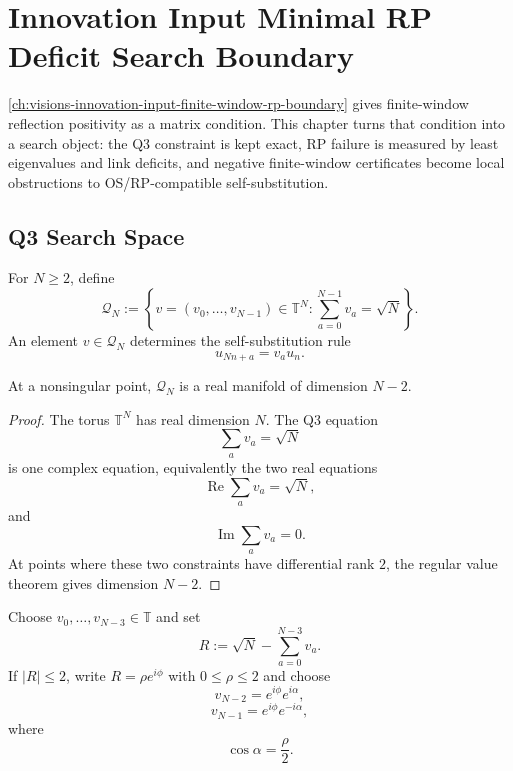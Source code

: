\chapter{Innovation Input Minimal RP Deficit Search Boundary}
\label{ch:visions-innovation-input-minimal-rp-deficit-search-boundary}

\autoref{ch:visions-innovation-input-finite-window-rp-boundary} gives
finite-window reflection positivity as a matrix condition. This chapter
turns that condition into a search object: the Q3 constraint is kept exact,
RP failure is measured by least eigenvalues and link deficits, and negative
finite-window certificates become local obstructions to OS/RP-compatible
self-substitution.

\section{Q3 Search Space}
\label{sec:innovation-input-qthree-search-space}

\begin{definition}
\label{def:innovation-input-qthree-phase-word-space}
For $N\ge2$, define
$$
\mathcal Q_N
:=
\left\{
v=(v_0,\ldots,v_{N-1})\in\mathbb T^N:
\sum_{a=0}^{N-1}v_a=\sqrt N
\right\}.
$$
An element $v\in\mathcal Q_N$ determines the self-substitution rule
$$
u_{Nn+a}=v_a u_n.
$$
\end{definition}

\begin{proposition}
\label{prop:innovation-input-qthree-space-expected-dimension}
At a nonsingular point, $\mathcal Q_N$ is a real manifold of dimension
$N-2$.
\end{proposition}

\begin{proof}
The torus $\mathbb T^N$ has real dimension $N$. The Q3 equation
$$
\sum_a v_a=\sqrt N
$$
is one complex equation, equivalently the two real equations
$$
\operatorname{Re}\sum_a v_a=\sqrt N,
$$
and
$$
\operatorname{Im}\sum_a v_a=0.
$$
At points where these two constraints have differential rank $2$, the
regular value theorem gives dimension $N-2$.
\end{proof}

\begin{definition}
\label{def:innovation-input-last-two-side-closure}
Choose $v_0,\ldots,v_{N-3}\in\mathbb T$ and set
$$
R:=\sqrt N-\sum_{a=0}^{N-3}v_a.
$$
If $|R|\le2$, write $R=\rho e^{i\phi}$ with $0\le\rho\le2$ and choose
$$
v_{N-2}=e^{i\phi}e^{i\alpha},
$$
$$
v_{N-1}=e^{i\phi}e^{-i\alpha},
$$
where
$$
\cos\alpha=\frac{\rho}{2}.
$$
\end{definition}

